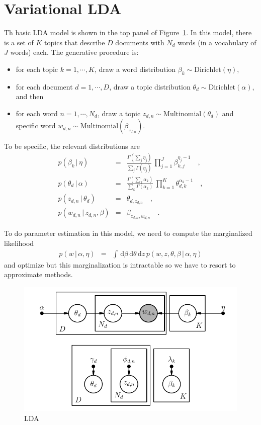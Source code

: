\documentclass[11pt]{article}
\newcommand{\fig}[1]{Figure~\ref{fig:#1}}
\newcommand{\figlabel}[1]{\label{fig:#1}}
\newcommand{\dd}{\ensuremath{\, \mathrm{d}}}
\begin{document}
\section{Variational LDA}

Th basic LDA model is shown in the top panel of \fig{lda}.
In this model, there is a set of $K$ topics that describe $D$ documents with
$N_d$ words (in a vocabulary of $J$ words) each.
The generative procedure is:
\begin{itemize}
\item{for each topic $k=1,\cdots,K$, draw a word distribution
$\beta_k \sim \mathrm{Dirichlet}(\eta)$,}
\item{for each document $d=1,\cdots,D$, draw a topic distribution $\theta_d
\sim \mathrm{Dirichlet}(\alpha)$, and then}
\item{for each word $n=1,\cdots,N_d$, draw a topic
$z_{d,n}\sim\mathrm{Multinomial}(\theta_d)$ and specific word
$w_{d,n}\sim\mathrm{Multinomial}(\beta_{z_{d,n}})$.}
\end{itemize}
To be specific, the relevant distributions are
\begin{eqnarray}
p(\beta_k\,|\,\eta) &=&
\frac{\Gamma\left( \sum_j \eta_j \right)}{\sum_j \Gamma(\eta_j)} \,
\prod_{j=1}^J \beta_{k,j}^{\eta_j-1} \quad, \\
p(\theta_d\,|\,\alpha) &=&
\frac{\Gamma\left( \sum_k \alpha_k \right)}{\sum_k \Gamma(\alpha_k)} \,
\prod_{k=1}^K \theta_{d,k}^{\alpha_k-1} \quad, \\
p(z_{d,n}\,|\,\theta_d) &=& \theta_{d,z_{d,n}} \quad, \\
p(w_{d,n}\,|\,z_{d,n},\beta) &=& \beta_{z_{d,n},w_{d,n}} \quad.
\end{eqnarray}

To do parameter estimation in this model, we need to compute the marginalized
likelihood
\begin{eqnarray}
p(w\,|\,\alpha,\eta) &=& \int\dd\beta\dd\theta\dd z \,
    p(w,z,\theta,\beta\,|\,\alpha,\eta)
\end{eqnarray}
and optimize but this marginalization is intractable so we have to resort to
approximate methods.

\begin{figure}
\begin{center}
\includegraphics{lda.pdf}
\end{center}
\caption{%
LDA
\figlabel{lda}}
\end{figure}
\end{document}

